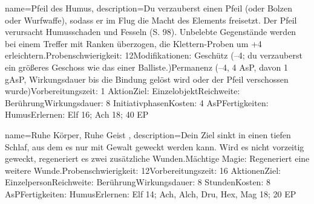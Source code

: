 {
    name={Pfeil des Humus},
    description={Du verzauberst einen Pfeil (oder Bolzen oder Wurfwaffe), sodass er im Flug die Macht des Elements freisetzt. Der Pfeil verursacht Humusschaden und Fesseln (S. 98). Unbelebte Gegenstände werden bei einem Treffer mit Ranken überzogen, die Klettern-Proben um +4 erleichtern.\newline Probenschwierigkeit: 12\newline Modifikationen: Geschütz (–4; du verzauberst ein größeres Geschoss wie das einer Balliste.)\newline Permanenz (–4, 4 AsP, davon 1 gAsP, Wirkungsdauer bis die Bindung gelöst wird oder der Pfeil verschossen wurde)\newline Vorbereitungszeit: 1 Aktion\newline Ziel: Einzelobjekt\newline Reichweite: Berührung\newline Wirkungsdauer: 8 Initiativphasen\newline Kosten: 4 AsP\newline Fertigkeiten: Humus\newline Erlernen: Elf 16; Ach 18; 40 EP}
}


{
    name={Ruhe Körper, Ruhe Geist },
    description={Dein Ziel sinkt in einen tiefen Schlaf, aus dem es nur mit Gewalt geweckt werden kann. Wird es nicht vorzeitig geweckt, regeneriert es zwei zusätzliche Wunden.\newline Mächtige Magie: Regeneriert eine weitere Wunde.\newline Probenschwierigkeit: 12\newline Vorbereitungszeit: 16 Aktionen\newline Ziel: Einzelperson\newline Reichweite: Berührung\newline Wirkungsdauer: 8 Stunden\newline Kosten: 8 AsP\newline Fertigkeiten: Humus\newline Erlernen: Elf 14; Ach, Alch, Dru, Hex, Mag 18; 20 EP}
}


